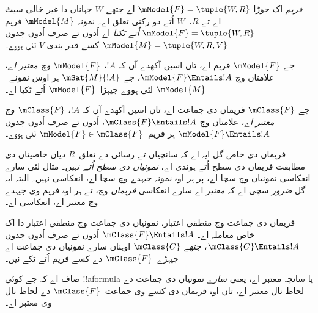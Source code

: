 \documentclass[../../../include/open-logic-section]{subfiles}
\begin{document}


\begin{defn}
  \emph{فریم} اک جوڑا $\mModel{F} = \tuple{W,R}$ اے جتھے $W$ جہاناں دا غیر خالی سیٹ اے تے $R$،~$W$ اُتے دو رکنی تعلق اے۔ نمونہ
  $\mModel{M}$ فریم $\mModel{F} = \tuple{W,R}$ \emph{اُتے ٹکیا} اے اُدوں تے صرف اُدوں جدوں $\mModel{M} = \tuple{W, R, V}$ کسے قدر بندی $V$ لئی ہووے۔
\end{defn}

\begin{defn}
  جے $\mModel{F}$ فریم اے، تاں اسیں آکھدے آں کہ $!A$، \emph{
    $\mModel{F}$ وچ معتبر اے}، علامتاں وچ $\mModel{F} \Entails !A$، جے $\mSat{M}{!A}$ ہر اوس نمونے~$\mModel{M}$ لئی ہووے جیہڑا~$\mModel{F}$ اُتے ٹکیا اے۔

  جے $\mClass{F}$ فریماں دی جماعت اے، تاں اسیں آکھدے آں کہ $!A$، \emph{
    $\mClass{F}$ وچ معتبر اے}، علامتاں وچ $\mClass{F} \Entails !A$، اُدوں تے صرف اُدوں جدوں $\mModel{F} \Entails
  !A$ ہر فریم~$\mModel{F} \in \mClass{F}$ لئی ہووے۔
\end{defn}

فریماں دی خاص گل ایہ اے کہ سانچیاں تے رسائی دے تعلق~$R$ دیاں خاصیتاں دی مطابقت فریماں دی سطح اُتے ہوندی اے، \emph{نمونیاں دی سطح اُتے نہیں}۔ مثال لئی  سارے انعکاسی نمونیاں وچ سچا اے، پر ہر اوہ نمونہ جیہدے وچ  سچا اے، انعکاسی نہیں۔ البتہ ایہ گل \emph{ضرور} سچی اے کہ  \emph{معتبر} اے سارے انعکاسی \emph{فریماں} وچ، تے ہر اوہ فریم وی جیہدے وچ  معتبر اے، انعکاسی اے۔

\begin{rem}
فریماں دی جماعت وچ منطقی اعتبار، نمونیاں دی جماعت وچ منطقی اعتبار دا اک خاص معاملہ اے۔ $\mClass{F} \Entails !A$ اُدوں تے صرف اُدوں جدوں
$\mClass{C} \Entails !A$، جتھے $\mClass{C}$ اوہناں سارے نمونیاں دی جماعت اے جیہڑے~$\mClass{F}$ دے کسے فریم اُتے ٹکے نیں۔

صاف اے کہ جے کوئی !!a{formula} یا سانچہ معتبر اے، یعنی \emph{سارے} نمونیاں دی جماعت دے لحاظ نال معتبر اے، تاں اوہ فریماں دی کسے وی جماعت~$\mClass{F}$ دے لحاظ نال وی معتبر اے۔
\end{rem}
\end{document}
